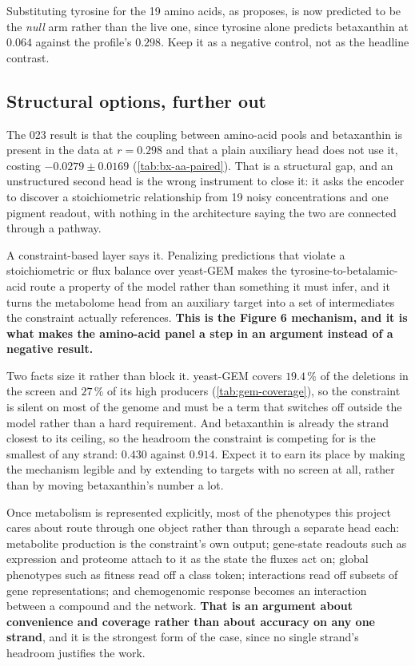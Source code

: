 Substituting tyrosine for the 19 amino acids, as  proposes, is now
predicted to be the \emph{null} arm rather than the live one, since tyrosine alone predicts
betaxanthin at $0.064$ against the profile's $0.298$. Keep it as a negative control, not as
the headline contrast.

\subsection{Structural options, further out}

 The 023 result is that
the coupling between amino-acid pools and betaxanthin is present in the data at $r = 0.298$
and that a plain auxiliary head does not use it, costing $-0.0279 \pm 0.0169$
(\cref{tab:bx-aa-paired}). That is a structural gap, and an unstructured second head is the
wrong instrument to close it: it asks the encoder to discover a stoichiometric relationship
from 19 noisy concentrations and one pigment readout, with nothing in the architecture
saying the two are connected through a pathway.

A constraint-based layer says it. Penalizing predictions that violate a stoichiometric or
flux balance over yeast-GEM makes the tyrosine-to-betalamic-acid route a property of the
model rather than something it must infer, and it turns the metabolome head from an
auxiliary target into a set of intermediates the constraint actually references.
\textbf{This is the Figure 6 mechanism, and it is what makes the amino-acid panel a step in
an argument instead of a negative result.}

Two facts size it rather than block it. yeast-GEM covers $19.4\,\%$ of the deletions in
the screen and $27\,\%$ of its high producers (\cref{tab:gem-coverage}), so the constraint
is silent on most of the genome and must be a term that switches off outside the model
rather than a hard requirement. And betaxanthin is already the strand closest to its
ceiling, so the headroom the constraint is competing for is the smallest of any strand:
$0.430$ against $0.914$. Expect it to earn its place by making the mechanism legible and by
extending to targets with no screen at all, rather than by moving betaxanthin's number a
lot.

 Once
metabolism is represented explicitly, most of the phenotypes this project cares about route
through one object rather than through a separate head each: metabolite production is the
constraint's own output; gene-state readouts such as expression and proteome attach to it as
the state the fluxes act on; global phenotypes such as fitness read off a class token;
interactions read off subsets of gene representations; and chemogenomic response becomes an
interaction between a compound and the network. \textbf{That is an argument about
convenience and coverage rather than about accuracy on any one strand}, and it is the
strongest form of the case, since no single strand's headroom justifies the work.

